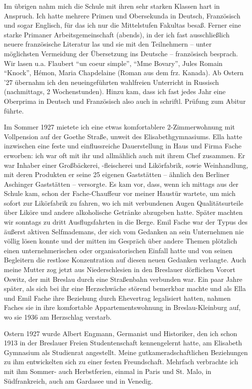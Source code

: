 \documentclass[a5paper,pagesize,10pt,twoside=true]{scrbook}
\renewcommand{\marginpar}[2][]{}
\begin{document}
Im übrigen nahm mich die Schule mit ihren sehr starken Klassen hart in Anspruch. Ich hatte mehrere Primen und Obersekunda in Deutsch, Französisch und sogar Englisch, für das ich nur die Mittelstufen Fakultas besaß. Ferner eine starke Primaner Arbeitsgemeinschaft (abends), in der ich fast ausschließlich neuere französische Literatur las und sie mit den Teilnehmern -- unter möglichsten Vermeidung der Übersetzung ins Deutsche -- französisch besprach. Wir lasen u.a. Flaubert \enquote{un coeur simple}, \enquote{Mme Bovary}, Jules Romain \enquote{Knock}, Hémon, Maria Chapdelaine (Roman aus dem frz. Kanada). Ab Ostern '27 übernahm ich den neueingeführten wahlfreien Unterricht in Russisch (nachmittags, 2 Wochenstunden). Hinzu kam, dass ich fast jedes Jahr eine Oberprima in Deutsch und Französisch also auch in schriftl. Prüfung zum Abitur führte.

\marginpar{565}
Im Sommer 1927 mietete ich eine etwas komfortablere 2-Zimmerwohnung mit Vollpension auf der Goethe Straße, unweit des Elisabethgymnasiums. Ella hatte inzwischen eine feste und einflussreiche Dauerstellung in Haus und Firma Fache erworben: ich war oft mit ihr und allmählich auch mit ihrem Chef zusammen. Er war Inhaber einer Großbäckerei, -fleischerei und Likörfabrik, sowie Weinhandlung, mit deren Produkten er seine 25 eigenen Gaststätten -- ähnlich den Berliner Aschinger Gaststätten -- versorgte. Es kam vor, dass, wenn ich mittags aus der Schule kam, schon der Fache-Chauffeur vor meiner Haustür wartete, um mich sofort zur Likörfabrik zu fahren, wo ich mit verbundenen Augen Qualitätsurteile über Liköre und andere alkoholische Getränke abzugeben hatte. Später machten wir sonntags zu dritt Ausflugsfahrten in die Berge. Emil Fache war der Typus des äußerst aktiven Selfmademans, der sich vom Gedanken an sein Unternehmen nie völlig lösen konnte und der mitten im Gespräch über andere Themen plötzlich einen unternehmerischen oder organisatorischen Einfall hatte und von seinen Begleitern die restlose Konzentration auf diesen neuen Gedanken verlangte. Auch meine Mutter zog jetzt aus Niederschlesien in den Breslauer dörflichen Vorort Oswitz, der mit Breslau durch eine Straßenbahn verbunden war. Ein paar Jahre später, als sich bei ihr eine Herzschwäche störend bemerkbar machte und als Ella und Emil Fache ihre Beziehung durch Ehevertrag legalisiert hatten, nahmen Faches sie in ihre komfortable Appartementswohnung in Breslau-Kleinburg auf, wo sie 1936 am Herzschlag verstarb.

Ostern 1927 wurde Albert Engmann, Germanist und Historiker, den ich schon 1913 in der Breslauer Freien Studentenschaft kennengelernt hatte, am Elisabeth Gymnasium als Studienrat angestellt. Meine gutkameradschaftlichen Beziehungen zu ihm entwickelten sich zu einer festen Freundschaft. Mehrfach verbrachte ich mit ihm Sommer- auch Herbstferien, einmal in Paris und St. Malo, in Südfrankreich, auch am Gardasee und in Venedig.
\end{document}
